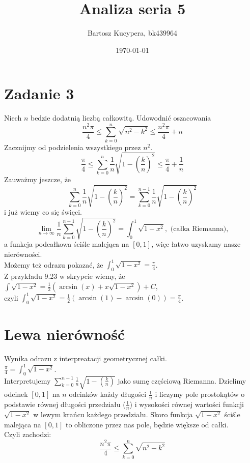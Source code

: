 \documentclass{article}
\title{Analiza seria 5}
\author{Bartosz Kucypera, bk439964}
\date{\today}
\begin{document}
\maketitle

\section*{Zadanie 3}
Niech $n$ bedzie dodatnią liczbą całkowitą. Udowodnić oszacowania 
$$\frac{n^2\pi}{4} \le \sum_{k=0}^n\sqrt{n^2-k^2} \le \frac{n^2\pi}{4} + n$$
Zacznijmy od podzielenia wszystkiego przez $n^2$.
$$\frac{\pi}{4} \le \sum_{k=0}^{n}\frac{1}{n}\sqrt{1-\left(\frac{k}{n}\right)^2} \le \frac{\pi}{4} + \frac{1}{n}$$
Zauważmy jeszcze, że $$\sum_{k=0}^{n}\frac{1}{n}\sqrt{1-\left(\frac{k}{n}\right)^2} = 
\sum_{k=0}^{n-1}\frac{1}{n}\sqrt{1-\left(\frac{k}{n}\right)^2}$$ i już wiemy co się święci.
$$\lim_{n\to \infty}\frac{1}{n}\sum_{k=0}^{n-1}\sqrt{1-\left(\frac{k}{n}\right)^2} = \int_0^1\sqrt{1-x^2}, \mbox{ (całka Riemanna),}$$ 
a funkcja podcałkowa ściśle malejąca na $[0, 1]$, więc łatwo uzyskamy nasze nierówności. \\
Możemy też odrazu pokazać, że $\int_0^1\sqrt{1-x^2} = \frac{\pi}{4}$. \\
Z przykładu 9.23 w skrypcie wiemy, że $\int\sqrt{1-x^2} = \frac{1}{2}(\arcsin(x) + x\sqrt{1-x^2}) +C$, \\
czyli $\int_0^1\sqrt{1-x^2} = \frac{1}{2}(\arcsin(1) - \arcsin(0)) = \frac{\pi}{4}$. \\

\section*{Lewa nierówność}
Wynika odrazu z interpreatacji geometrycznej całki. \\
$\displaystyle \frac{\pi}{4} = \int_0^1\sqrt{1-x^2}$. \\
Interpretujemy $\displaystyle \sum_{k=0}^{n-1}\frac{1}{n}\sqrt{1-\left(\frac{k}{n}\right)}$ jako sumę częściową Riemanna.
Dzielimy odcinek $[0, 1]$ na $n$ odcinków każdy długości $\frac{1}{n}$ i liczymy pole 
prostokątów o podstawie równej długości przedziału ($\frac{1}{n}$) i wysokości równej wartości funkcji $\sqrt{1-x^2}$ w lewym krańcu każdego przedziału. Skoro funkcja $\sqrt{1-x^2}$ ściśle malejąca na $[0, 1]$
to obliczone przez nas pole, będzie większe od całki. \\
Czyli zachodzi:
$$ \frac{n^2 \pi}{4} \le \sum_{k=0}^{n}\sqrt{n^2-k^2}$$
\end{document}
